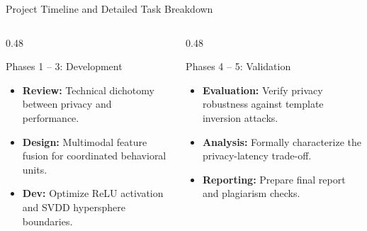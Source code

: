 \begin{frame}{Project Timeline and Detailed Task Breakdown}
\begin{center}
{
        }
    \end{center}

    \begin{columns}[T]
        \begin{column}{0.48\textwidth}
            \begin{block}{Phases 1 -- 3: Development}
                \tiny
                \begin{itemize}
                    \item \textbf{Review:} Technical dichotomy between privacy and performance.
                    \item \textbf{Design:} Multimodal feature fusion for coordinated behavioral units.
                    \item \textbf{Dev:} Optimize ReLU activation and SVDD hypersphere boundaries.
                \end{itemize}
            \end{block}
        \end{column}
        \begin{column}{0.48\textwidth}
            \begin{block}{Phases 4 -- 5: Validation}
                \tiny
                \begin{itemize}
                    \item \textbf{Evaluation:} Verify privacy robustness against template inversion attacks.
                    \item \textbf{Analysis:} Formally characterize the privacy-latency trade-off.
                    \item \textbf{Reporting:} Prepare final report and plagiarism checks.
                \end{itemize}
            \end{block}
        \end{column}
    \end{columns}
\end{frame}